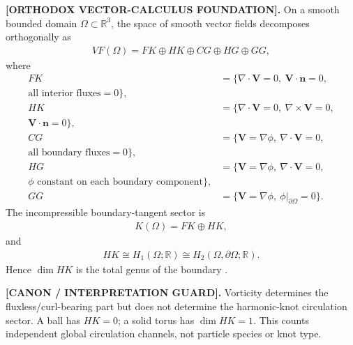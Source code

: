 \documentclass[11pt]{article}
\theoremstyle{definition}
\theoremstyle{plain}
\theoremstyle{remark}
\begin{document}
        \textbf{[ORTHODOX VECTOR-CALCULUS FOUNDATION].}
        On a smooth bounded domain \(\Omega\subset\mathbb R^3\), the space of
        smooth vector fields decomposes orthogonally as
        \begin{align}
            VF(\Omega)
            =
            FK\oplus HK\oplus CG\oplus HG\oplus GG,
            \label{eq:canon_hodge_five_way}
        \end{align}
        where
        \begin{align}
            FK&=
            \{\nabla\cdot\mathbf V=0,\ \mathbf V\cdot\mathbf n=0,\\
            \text{all interior fluxes}=0\},\\
            HK&=
            \{\nabla\cdot\mathbf V=0,\ \nabla\times\mathbf V=0,\\
            \mathbf V\cdot\mathbf n=0\},\\
            CG&=
            \{\mathbf V=\nabla\phi,\ \nabla\cdot\mathbf V=0,\\
            \text{all boundary fluxes}=0\},\\
            HG&=
            \{\mathbf V=\nabla\phi,\ \nabla\cdot\mathbf V=0,\\
            \phi\text{ constant on each boundary component}\},\\
            GG&=
            \{\mathbf V=\nabla\phi,\ \phi|_{\partial\Omega}=0\}.
            \label{eq:canon_hodge_subspaces}
        \end{align}
        The incompressible boundary-tangent sector is
        \begin{align}
            K(\Omega)=FK\oplus HK,
            \label{eq:canon_fluid_knot_hodge_sector}
        \end{align}
        and
        \begin{align}
            HK
            \cong
            H_1(\Omega;\mathbb R)
            \cong
            H_2(\Omega,\partial\Omega;\mathbb R).
            \label{eq:canon_harmonic_knot_homology}
        \end{align}
        Hence \(\dim HK\) is the total genus of the boundary
        \cite{CantarellaDeTurckGluck2002Hodge}.

        \textbf{[CANON / INTERPRETATION GUARD].}
        Vorticity determines the fluxless/curl-bearing part but does not determine
        the harmonic-knot circulation sector.  A ball has \(HK=0\); a solid torus
        has \(\dim HK=1\).  This counts independent global circulation channels, not
        particle species or knot type.
\end{document}
